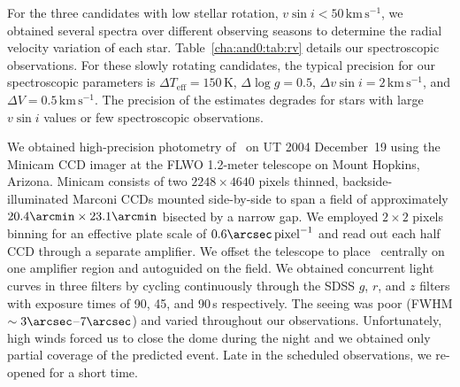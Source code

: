 For the three candidates with low stellar rotation, $v\sin{i} < 50\,\mathrm{km\,s^{-1}}$, we obtained several spectra over different observing seasons to determine the radial velocity variation of each star. Table~\ref{cha:and0:tab:rv} details our spectroscopic observations. For these slowly rotating candidates, the typical precision for our spectroscopic parameters is $\Delta T_{\mathrm{eff}} = 150\,\mathrm{K}$, $\Delta \log{g} = 0.5$, $\Delta v \sin{i} = 2\,\mathrm{km\,s^{-1}}$, and $\Delta V = 0.5\,\mathrm{km\,s^{-1}}$. The precision of the estimates degrades for stars with large $v\sin{i}$ values or few spectroscopic observations.

We obtained high-precision photometry of \tFive\ on UT 2004 December~19 using the Minicam CCD imager at the FLWO 1.2-meter telescope on
Mount Hopkins, Arizona.  Minicam consists of two $2248\times 4640$ pixels
thinned, backside-illuminated Marconi CCDs mounted side-by-side to
span a field of approximately $20.4\arcmin \times 23.1 \arcmin$ bisected by
a narrow gap.  We employed $2 \times 2$ pixels binning for an effective
plate scale of $0.6\arcsec\,\mathrm{pixel}^{-1}$ and read out each half CCD
through a separate amplifier.  We offset the telescope to place
\tFive\ centrally on one amplifier region and autoguided on the
field.  We obtained concurrent light curves in three filters by cycling
continuously through the SDSS $g$, $r$, and $z$ filters with exposure times
of 90, 45, and 90\,s respectively.  The seeing was poor
(FWHM $\sim3\arcsec$--$7\arcsec$) and varied throughout our observations.
Unfortunately, high winds forced us to close the dome during the night
and we obtained only partial coverage of the predicted event.  Late in
the scheduled observations, we re-opened for a short time.  

